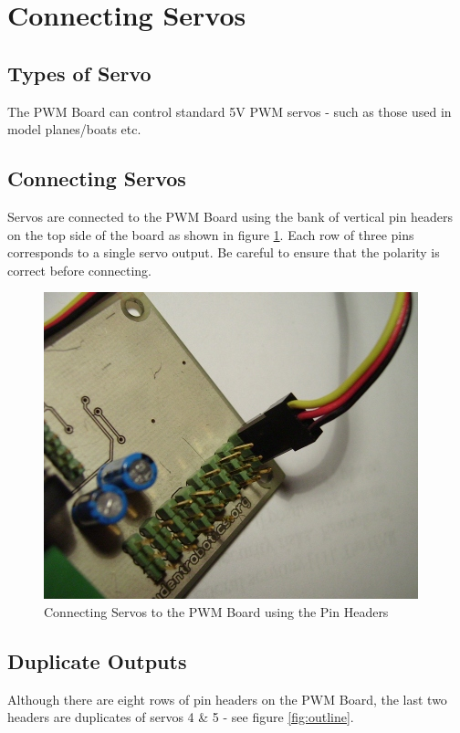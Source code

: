 \documentclass[a4paper, 12pt]{article}
\begin{document}
\section{Connecting Servos}
\subsection{Types of Servo}
The PWM Board can control standard 5V PWM servos - such as those used in model planes/boats etc. 

\subsection{Connecting Servos}
Servos are connected to the PWM Board using the bank of vertical pin headers on the top side of the board as shown in figure \ref{fig:servo-header}. Each row of three pins corresponds to a single servo output. Be careful to ensure that the polarity is correct before connecting. 

\vspace{12pt}

\begin{figure}[h]
\centering
\includegraphics[scale=0.6, angle=0]{servo-header}
\caption{Connecting Servos to the PWM Board using the Pin Headers}
\label{fig:servo-header}
\end{figure}

\subsection{Duplicate Outputs}
Although there are eight rows of pin headers on the PWM Board, the last two headers are duplicates of servos 4 \& 5 - see figure \ref{fig:outline}.  
\end{document}
